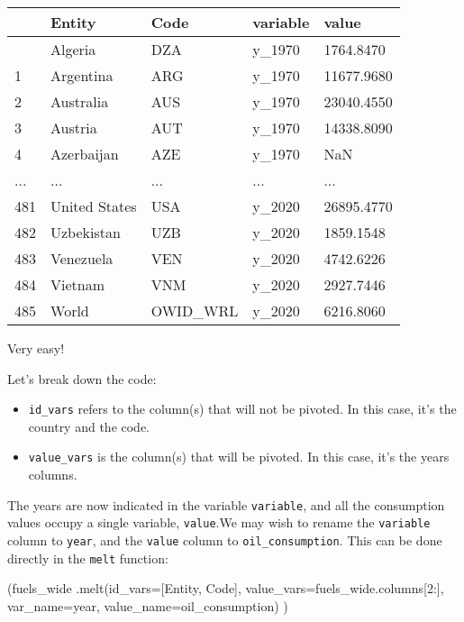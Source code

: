 \documentclass[
  letterpaper,
  DIV=11,
  numbers=noendperiod]{scrreprt}
\newenvironment{Shaded}{\begin{snugshade}}{\end{snugshade}}
\newcommand{\DecValTok}[1]{\textcolor[rgb]{0.68,0.00,0.00}{#1}}
\newcommand{\NormalTok}[1]{\textcolor[rgb]{0.00,0.23,0.31}{#1}}
\newcommand{\OperatorTok}[1]{\textcolor[rgb]{0.37,0.37,0.37}{#1}}
\newcommand{\StringTok}[1]{\textcolor[rgb]{0.13,0.47,0.30}{#1}}
\providecommand{\tightlist}{%
  \setlength{\itemsep}{0pt}\setlength{\parskip}{0pt}}\usepackage{longtable,booktabs,array}
\begin{document}
\begin{longtable}[]{@{}lllll@{}}
\toprule\noalign{}
& Entity & Code & variable & value \\
\midrule\noalign{}
\endhead
\bottomrule\noalign{}
\endlastfoot
0 & Algeria & DZA & y\_1970 & 1764.8470 \\
1 & Argentina & ARG & y\_1970 & 11677.9680 \\
2 & Australia & AUS & y\_1970 & 23040.4550 \\
3 & Austria & AUT & y\_1970 & 14338.8090 \\
4 & Azerbaijan & AZE & y\_1970 & NaN \\
... & ... & ... & ... & ... \\
481 & United States & USA & y\_2020 & 26895.4770 \\
482 & Uzbekistan & UZB & y\_2020 & 1859.1548 \\
483 & Venezuela & VEN & y\_2020 & 4742.6226 \\
484 & Vietnam & VNM & y\_2020 & 2927.7446 \\
485 & World & OWID\_WRL & y\_2020 & 6216.8060 \\
\end{longtable}

Very easy!

Let's break down the code:

\begin{itemize}
\tightlist
\item
  \texttt{id\_vars} refers to the column(s) that will not be pivoted. In
  this case, it's the country and the code.
\item
  \texttt{value\_vars} is the column(s) that will be pivoted. In this
  case, it's the years columns.
\end{itemize}

The years are now indicated in the variable \texttt{variable}, and all
the consumption values occupy a single variable, \texttt{value}.We may
wish to rename the \texttt{variable} column to \texttt{year}, and the
\texttt{value} column to \texttt{oil\_consumption}. This can be done
directly in the \texttt{melt} function:

\begin{Shaded}
\begin{Highlighting}[]
\NormalTok{(fuels\_wide}
\NormalTok{ .melt(id\_vars}\OperatorTok{=}\NormalTok{[}\StringTok{\textquotesingle{}Entity\textquotesingle{}}\NormalTok{, }\StringTok{\textquotesingle{}Code\textquotesingle{}}\NormalTok{], }
\NormalTok{       value\_vars}\OperatorTok{=}\NormalTok{fuels\_wide.columns[}\DecValTok{2}\NormalTok{:],}
\NormalTok{       var\_name}\OperatorTok{=}\StringTok{\textquotesingle{}year\textquotesingle{}}\NormalTok{, }
\NormalTok{       value\_name}\OperatorTok{=}\StringTok{\textquotesingle{}oil\_consumption\textquotesingle{}}\NormalTok{)}
\NormalTok{)}
\end{Highlighting}
\end{Shaded}
\end{document}
